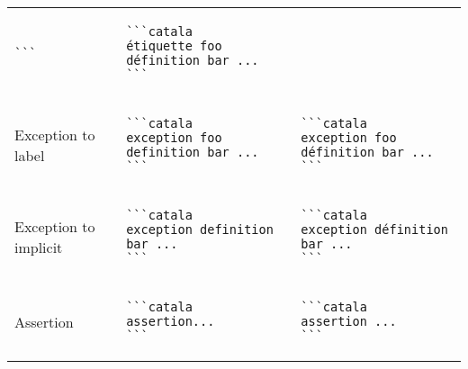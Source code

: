 \documentclass[a3paper,landscape]{article}
\begin{document}
\begin{multicols*}{2}
\begin{center}
\begin{tabular}{p{}p{}p{}}
\begin{verbatim}
```
\end{verbatim}
\vspace*{-1.75em}
&
\vspace*{-1.75em}
\begin{verbatim}
```catala
étiquette foo définition bar ...
```
\end{verbatim}
\vspace*{-1.75em}
\\
Exception to label&
\vspace*{-1.75em}
\begin{verbatim}
```catala
exception foo definition bar ...
```
\end{verbatim}
\vspace*{-1.75em}
&
\vspace*{-1.75em}
\begin{verbatim}
```catala
exception foo définition bar ...
```
\end{verbatim}
\vspace*{-1.75em}
\\
Exception to implicit&
\vspace*{-1.75em}
\begin{verbatim}
```catala
exception definition bar ...
```
\end{verbatim}
\vspace*{-1.75em}
&
\vspace*{-1.75em}
\begin{verbatim}
```catala
exception définition bar ...
```
\end{verbatim}
\vspace*{-1.75em}
\\
Assertion&
\vspace*{-1.75em}
\begin{verbatim}
```catala
assertion...
```
\end{verbatim}
\vspace*{-1.75em}
&
\vspace*{-1.75em}
\begin{verbatim}
```catala
assertion ...
```
\end{verbatim}
\vspace*{-1.75em}
\\
\bottomrule
\end{tabular}
\end{center}






\end{multicols*}
\end{document}
